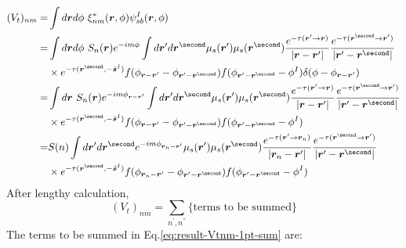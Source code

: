 \documentclass [10pt,letterpaper]{article}
\renewcommand{\vec}{\vectorsym}
\newcommand{\unitvec}[1]{\hat{\vec{#1}}}
\begin{document}
\begin{equation} \label{eq:der-Vtnm-1pt-1}
	\begin{split}
		(V_t)_{n m}
		=&
		\int d\vec{r} d\phi
		\ \xi^*_{n m}(\vec{r},\phi)
		\psi_{sb}^I(\vec{r},\phi)
		\\
		=&
		\int d\vec{r} d\phi
		\ S_n(\vec{r})
		e^{-i m \phi}
		\int d\vec{r}^\prime d\vec{r}^\second
		\mu_s(\vec{r}^\prime)
		\mu_s(\vec{r}^\second)
		\frac
		{e^{-\tau(\vec{r}^\prime\to\vec{r})}}
		{\lvert \vec{r}-\vec{r}^\prime \rvert}
		\frac
		{e^{-\tau(\vec{r}^\second\to\vec{r}^\prime)}}
		{\lvert \vec{r}^\prime-\vec{r}^\second \rvert}
		\\
		&
		\times
		e^{-\tau(\vec{r}^\second,-\unitvec{s}^I)} 
		f(\phi_{\vec{r}-\vec{r}^\prime}-\phi_{\vec{r}^\prime-\vec{r}^\second})
		f(\phi_{\vec{r}^\prime-\vec{r}^\second}-\phi^I)
		\delta(\phi-\phi_{\vec{r}-\vec{r}^\prime})
		\\
		=&
		\int d\vec{r}
		\ S_n(\vec{r})
		e^{-i m \phi_{\vec{r}-\vec{r}^\prime}}
		\int d\vec{r}^\prime d\vec{r}^\second
		\mu_s(\vec{r}^\prime)
		\mu_s(\vec{r}^\second)
		\frac
		{e^{-\tau(\vec{r}^\prime\to\vec{r})}}
		{\lvert \vec{r}-\vec{r}^\prime \rvert}
		\frac
		{e^{-\tau(\vec{r}^\second\to\vec{r}^\prime)}}
		{\lvert \vec{r}^\prime-\vec{r}^\second \rvert}
		\\
		&
		\times
		e^{-\tau(\vec{r}^\second,-\unitvec{s}^I)} 
		f(\phi_{\vec{r}-\vec{r}^\prime}-\phi_{\vec{r}^\prime-\vec{r}^\second})
		f(\phi_{\vec{r}^\prime-\vec{r}^\second}-\phi^I)
		\\
		=&
		S(n)
		\int d\vec{r}^\prime d\vec{r}^\second
		e^{-i m \phi_{\vec{r}_n-\vec{r}^\prime}}
		\mu_s(\vec{r}^\prime)
		\mu_s(\vec{r}^\second)
		\frac
		{e^{-\tau(\vec{r}^\prime\to\vec{r}_n)}}
		{\lvert \vec{r}_n-\vec{r}^\prime \rvert}
		\frac
		{e^{-\tau(\vec{r}^\second\to\vec{r}^\prime)}}
		{\lvert \vec{r}^\prime-\vec{r}^\second \rvert}
		\\
		&
		\times
		e^{-\tau(\vec{r}^\second,-\unitvec{s}^I)} 
		f(\phi_{\vec{r}_n-\vec{r}^\prime}-\phi_{\vec{r}^\prime-\vec{r}^\second})
		f(\phi_{\vec{r}^\prime-\vec{r}^\second}-\phi^I)
	\end{split}
\end{equation}
After lengthy calculation,
\begin{equation} \label{eq:result-Vtnm-1pt-sum}
	(V_t)_{n m}
	=
	\sum \limits_{n^\prime, n^\second}
	\text{\{terms to be summed\}}
\end{equation}
The terms to be summed in Eq.\eqref{eq:result-Vtnm-1pt-sum} are:
\end{document}
